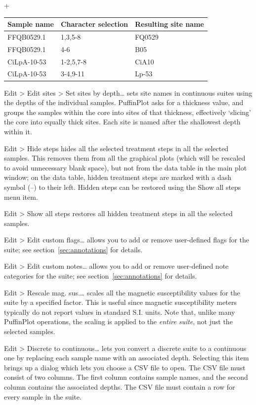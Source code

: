 \documentclass[a4paper,british]{article}
\newcommand{\menuitemlabel}[1]{%
\mbox{\textsf{#1}}\hfil}
\newenvironment{menuitemlist}%
{\begin{list}{}{%
\renewcommand{\makelabel}{\menuitemlabel}%
\setlength{\labelwidth}{35pt}%
\setlength{\leftmargin}%
             {\labelwidth+\labelsep}}}%
{\end{list}}
\newcommand{\ppcmd}[1]{\textsf{#1}} %
\newcommand{\submenu}{ \textgreater{} } %
\begin{document}
\begin{menuitemlist}
\begin{tabular}{lll} \toprule
Sample name & Character selection & Resulting site name \\ \midrule
FFQB0529.1 & 1,3,5-8 & FQ0529 \\
FFQB0529.1 & 4-6 & B05 \\
CiLpA-10-53 & 1-2,5,7-8 & CiA10 \\
CiLpA-10-53 & 3-4,9-11 & Lp-53 \\
\bottomrule \end{tabular}

\item[Edit\submenu Edit sites\submenu Set sites by depth\ldots] sets site
  names in continuous suites using the depths of the individual samples.
  PuffinPlot asks for a thickness value, and groups the samples within the
  core into sites of that thickness, effectively `slicing' the core into
  equally thick sites. Each site is named after the shallowest depth within
  it.

\item[Edit\submenu Hide steps] hides all the selected treatment steps in all
  the selected samples. This removes them from all the graphical plots (which
  will be rescaled to avoid unnecessary blank space), but not from the data
  table in the main plot window; on the data table, hidden treatment steps
  are marked with a dash symbol (--) to their left. Hidden steps can be
  restored using the \ppcmd{Show all steps} menu item.

\item[Edit\submenu Show all steps] restores all hidden treatment steps in all
  the selected samples.

\item[Edit\submenu Edit custom flags\ldots] allows you to add or remove
  user-defined flags for the suite; see section~\ref{sec:annotations} for
  details.

\item[Edit\submenu Edit custom notes\ldots] allows you to add or remove
  user-defined note categories for the suite; see
  section~\ref{sec:annotations} for details.

\item[Edit\submenu Rescale mag. sus.\ldots] scales all the magnetic
  susceptibility values for the suite by a specified factor. This is useful
  since magnetic susceptibility meters typically do not report values in
  standard S.I. units. Note that, unlike many PuffinPlot operations, the
  scaling is applied to the {\em entire suite}, not just the selected
  samples.

\item[Edit\submenu Discrete to continuous\ldots] lets you convert a
  discrete suite to a continuous one by replacing each sample name with
  an associated depth. Selecting this item brings up a dialog which lets
  you choose a CSV file to open. The CSV file must consist of two
  columns. The first column contains sample names, and the second column
  contains the associated depths. The CSV file must contain a row for
  every sample in the suite.
\end{menuitemlist}
\end{document}
